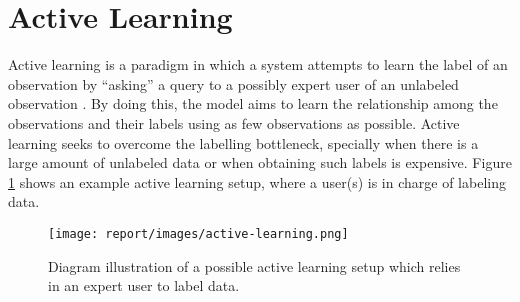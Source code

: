 \section{Active Learning} \label{sect:theory:active-learning}

Active learning is a paradigm in which a system attempts to learn the label of an observation by ``asking'' a query to a possibly expert user of an unlabeled observation \cite{report:active-learning}. By doing this, the model aims to learn the relationship among the observations and their labels using as few observations as possible. Active learning seeks to overcome the labelling bottleneck, specially when there is a large amount of unlabeled data or when obtaining such labels is expensive. Figure \ref{fig:active-learning} shows an example active learning setup, where a user(s) is in charge of labeling data.

\begin{figure}[H]
  \centering
  \texttt{[image: report/images/active-learning.png]}
  \caption{Diagram illustration of a possible active learning setup which relies in an expert user to label data.}
  \label{fig:active-learning}
\end{figure}
